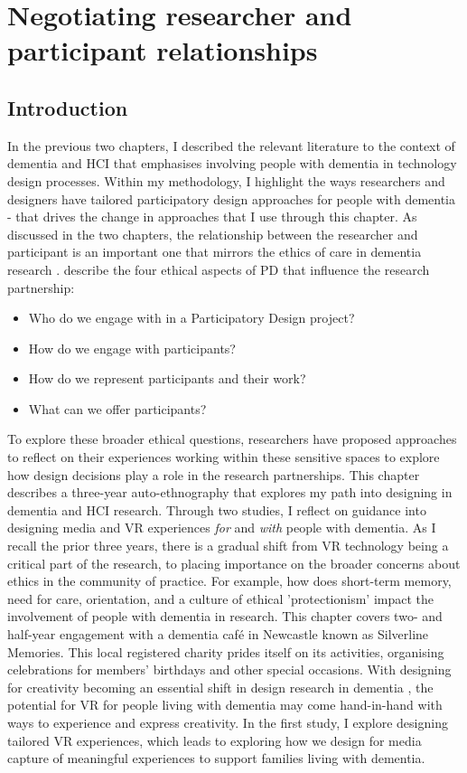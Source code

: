 \chapter{Negotiating researcher and participant relationships}
\label{NegotatingReseacherParticipantRelationships}
\section{Introduction}
\label{Relationships:Introduction}
In the previous two chapters, I described the relevant literature to the context of dementia and HCI that emphasises involving people with dementia in technology design processes. Within my methodology, I highlight the ways researchers and designers have tailored participatory design approaches for people with dementia - that drives the change in approaches that I use through this chapter. As discussed in the two chapters, the relationship between the researcher and participant is an important one that mirrors the ethics of care in dementia research \cite{hamington_integrating_2019}. \cite{robertson2012ethics} describe the four ethical aspects of PD that influence the research partnership:
\begin{itemize}
\item Who do we engage with in a Participatory Design project?
\item How do we engage with participants?
\item How do we represent participants and their work?
\item What can we offer participants?
\end{itemize}

To explore these broader ethical questions, researchers have proposed approaches to reflect on their experiences working within these sensitive spaces to explore how design decisions play a role in the research partnerships. This chapter describes a three-year auto-ethnography that explores my path into designing in dementia and HCI research. Through two studies, I reflect on guidance into designing media and VR experiences \textit{for} and \textit{with} people with dementia. As I recall the prior three years, there is a gradual shift from VR technology being a critical part of the research, to placing importance on the broader concerns about ethics in the community of practice. For example, how does short-term memory, need for care, orientation, and a culture of ethical 'protectionism' impact the involvement of people with dementia in research. This chapter covers two- and half-year engagement with a dementia café in Newcastle known as Silverline Memories. This local registered charity prides itself on its activities, organising celebrations for members' birthdays and other special occasions. With designing for creativity becoming an essential shift in design research in dementia \citep{john_killick_claire_craig_creativity_2012,morrissey_creative_2015,wallace_design-led_2013}, the potential for VR for people living with dementia may come hand-in-hand with ways to experience and express creativity. In the first study, I explore designing tailored VR experiences, which leads to exploring how we design for media capture of meaningful experiences to support families living with dementia.

